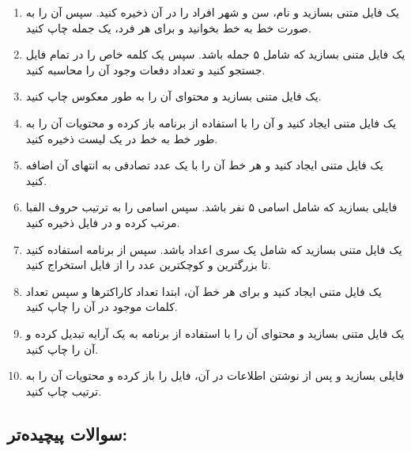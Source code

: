 \documentclass[b5paper,12pt]{article}
\begin{document}
	\begin{enumerate}
		\item یک فایل متنی بسازید و نام، سن و شهر افراد را در آن ذخیره کنید. سپس آن را به صورت خط به خط بخوانید و برای هر فرد، یک جمله چاپ کنید.
		\item یک فایل متنی بسازید که شامل ۵ جمله باشد. سپس یک کلمه خاص را در تمام فایل جستجو کنید و تعداد دفعات وجود آن را محاسبه کنید.
		\item یک فایل متنی بسازید و محتوای آن را به طور معکوس چاپ کنید.
		\item یک فایل متنی ایجاد کنید و آن را با استفاده از برنامه باز کرده و محتویات آن را به طور خط به خط در یک لیست ذخیره کنید.
		\item یک فایل متنی ایجاد کنید و هر خط آن را با یک عدد تصادفی به انتهای آن اضافه کنید.
		\item فایلی بسازید که شامل اسامی ۵ نفر باشد. سپس اسامی را به ترتیب حروف الفبا مرتب کرده و در فایل ذخیره کنید.
		\item یک فایل متنی بسازید که شامل یک سری اعداد باشد. سپس از برنامه استفاده کنید تا بزرگترین و کوچکترین عدد را از فایل استخراج کنید.
		\item یک فایل متنی ایجاد کنید و برای هر خط آن، ابتدا تعداد کاراکترها و سپس تعداد کلمات موجود در آن را چاپ کنید.
		\item یک فایل متنی بسازید و محتوای آن را با استفاده از برنامه به یک آرایه تبدیل کرده و آن را چاپ کنید.
		\item فایلی بسازید و پس از نوشتن اطلاعات در آن، فایل را باز کرده و محتویات آن را به ترتیب چاپ کنید.
	\end{enumerate}
	
	\subsection*{سوالات پیچیده‌تر:}
	
\end{document}
